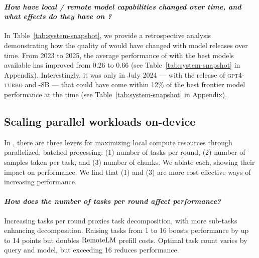 


\vspace{-0.75em}\paragraph{\textit{How have local / remote model capabilities changed over time, and what effects do they have on \system?}}
In Table~\ref{tab:system-snapshot}, we provide a retrospective analysis demonstrating how the quality of \system would have changed with model releases over time. 
From 2023 to 2025, the average performance of \system with the best models available has improved from 0.26 to 0.66 (see Table~\ref{tab:system-snapshot} in Appendix). Interestingly, it was only in July 2024 --- with the release of \textsc{gpt4-turbo} and \llamathreeone-8B --- that \system could have come within 12\% of the best frontier model performance at the time (see Table~\ref{tab:system-snapshot} in Appendix). 



\vspace{-0.5em}\subsection{Scaling parallel workloads on-device}
\label{subsec:results-workloads}


In \system, there are three levers for maximizing local compute resources through parallelized, batched processing: (1) number of tasks per round, (2) number of samples taken per task, and (3) number of chunks. We ablate each, showing their impact on performance. We find that (1) and (3) are more cost effective ways of increasing performance.


\vspace{-0.75em}\paragraph{\textit{How does the number of tasks per round affect performance?}} Increasing tasks per round proxies task decomposition, with more sub-tasks enhancing decomposition. Raising tasks from 1 to 16 boosts performance by up to 14 points but doubles $\mathrm{RemoteLM}$ prefill costs. Optimal task count varies by query and model, but exceeding 16 reduces performance.


